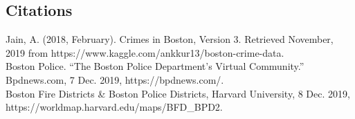 \documentclass[a0,landscape]{a0poster}
\newtheorem{theorem}{Theorem}[section]
\newtheorem{corollary}[theorem]{Corollary}
\let\Section=\section
\def\section{\setcounter{equation}{0}\Section}
\newcommand{\1}{\bold{1}}
\begin{document}
\begin{multicols}{3}
\section*{Citations}

Jain, A. (2018, February). Crimes in Boston, Version 3. Retrieved November, 2019 from https://www.kaggle.com/ankkur13/boston-crime-data.\\
Boston Police. “The Boston Police Department's Virtual Community.” Bpdnews.com, 7 Dec. 2019, https://bpdnews.com/.\\
Boston Fire Districts & Boston Police Districts, Harvard University, 8 Dec. 2019, https://worldmap.harvard.edu/maps/BFD_BPD2.



%
%
%
%
%
%
%
%
%
%
%

\end{multicols}
\end{document}
